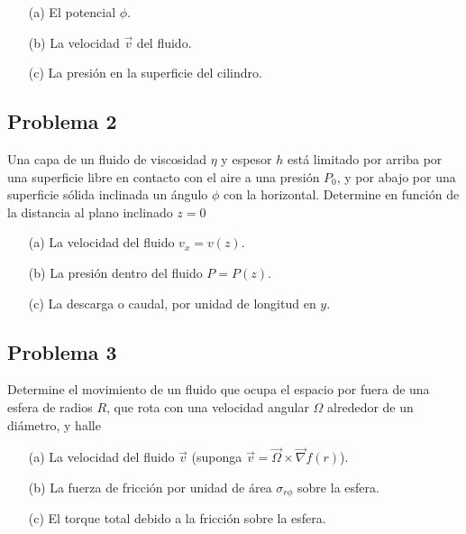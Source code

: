 \documentclass{article}
\begin{document}
\begin{enumerate}
    \item[(a)] El potencial $\phi$.
    \item[(b)] La velocidad $\vec{v}$ del fluido.
    \item[(c)] La presión en la superficie del cilindro.
\end{enumerate}

\subsection*{Problema 2}

Una capa de un fluido de viscosidad $\eta$ y espesor $h$ está limitado por arriba por una superficie libre en contacto con el aire a una presión $P_0$, y por abajo por una superficie sólida inclinada un ángulo $\phi$ con la horizontal. Determine en función de la distancia al plano inclinado $z = 0$

\begin{enumerate}
    \item[(a)] La velocidad del fluido $v_x = v(z)$.
    \item[(b)] La presión dentro del fluido $P = P(z)$.
    \item[(c)] La descarga o caudal, por unidad de longitud en $y$.
\end{enumerate}

\subsection*{Problema 3}

Determine el movimiento de un fluido que ocupa el espacio por fuera de una esfera de radios $R$, que rota con una velocidad angular $\Omega$ alrededor de un diámetro, y halle

\begin{enumerate}
    \item[(a)] La velocidad del fluido $\vec{v}$ (suponga $\vec{v} = \vec{\Omega} \times \vec{\nabla} f(r)$).
    \item[(b)] La fuerza de fricción por unidad de área $\sigma_{r\phi}$ sobre la esfera.
    \item[(c)] El torque total debido a la fricción sobre la esfera.
\end{enumerate}
\end{document}

